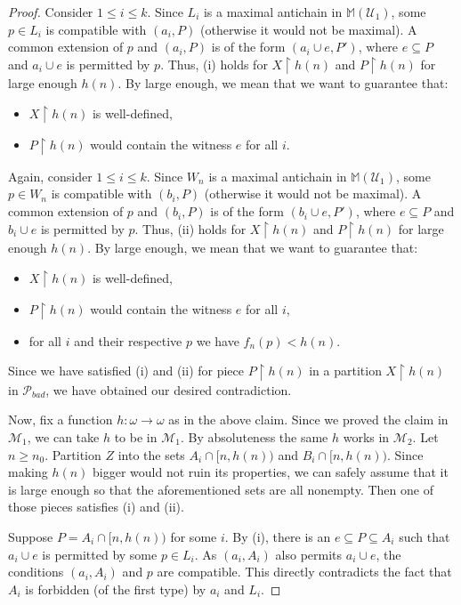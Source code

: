\documentclass[12pt]{article}\usepackage[english]{babel}
\newcommand{\M}{\mathbb{M}}
\newcommand{\calM}{\mathcal{M}}
\newcommand{\calP}{\mathcal{P}}
\newcommand{\calU}{\mathcal{U}}
\theoremstyle{definition}
\theoremstyle{remark}
\begin{document}
\begin{proof}
  Consider $1 \leq i \leq k$.
  Since $L_i$ is a maximal antichain in $\M(\calU_1)$, some $p \in L_i$ is compatible with $(a_i, P)$ (otherwise it would not be maximal).
  A common extension of $p$ and $(a_i, P)$ is of the form $(a_i \cup e, P')$, where $e \subseteq P$ and $a_i \cup e$ is permitted by $p$.
  Thus, (i) holds for $X \restriction h(n)$ and $P \restriction h(n)$ for large enough $h(n)$.
  By large enough, we mean that we want to guarantee that:
  \begin{itemize}
    \item $X \restriction h(n)$ is well-defined,
    \item $P \restriction h(n)$ would contain the witness $e$ for all $i$.
  \end{itemize}

  Again, consider $1 \leq i \leq k$.
  Since $W_n$ is a maximal antichain in $\M(\calU_1)$, some $p \in W_n$ is compatible with $(b_i, P)$ (otherwise it would not be maximal).
  A common extension of $p$ and $(b_i, P)$ is of the form $(b_i \cup e, P')$, where $e \subseteq P$ and $b_i \cup e$ is permitted by $p$.
  Thus, (ii) holds for $X \restriction h(n)$ and $P \restriction h(n)$ for large enough $h(n)$.
  By large enough, we mean that we want to guarantee that:
  \begin{itemize}
    \item $X \restriction h(n)$ is well-defined,
    \item $P \restriction h(n)$ would contain the witness $e$ for all $i$,
    \item for all $i$ and their respective $p$ we have $f_n(p) < h(n)$.
  \end{itemize}
  
  Since we have satisfied (i) and (ii) for piece $P \restriction h(n)$ in a partition $X \restriction h(n)$ in $\calP_{bad}$, we have obtained our desired contradiction.

  Now, fix a function $h : \omega \longrightarrow \omega$ as in the above claim.
  Since we proved the claim in $\calM_1$, we can take $h$ to be in $\calM_1$.
  By absoluteness the same $h$ works in $\calM_2$.
  Let $n \geq n_0$.
  Partition $Z$ into the sets $A_i \cap [n, h(n))$ and $B_i \cap [n, h(n))$.
  Since making $h(n)$ bigger would not ruin its properties, we can safely assume that it is large enough so that the aforementioned sets are all nonempty.
  Then one of those pieces satisfies (i) and (ii).

  Suppose $P = A_i \cap [n, h(n))$ for some $i$.
  By (i), there is an $e \subseteq P \subseteq A_i$ such that $a_i \cup e$ is permitted by some $p \in L_i$.
  As $(a_i, A_i)$ also permits $a_i \cup e$, the conditions $(a_i, A_i)$ and $p$ are compatible.
  This directly contradicts the fact that $A_i$ is forbidden (of the first type) by $a_i$ and $L_i$.


\end{proof}
\end{document}
